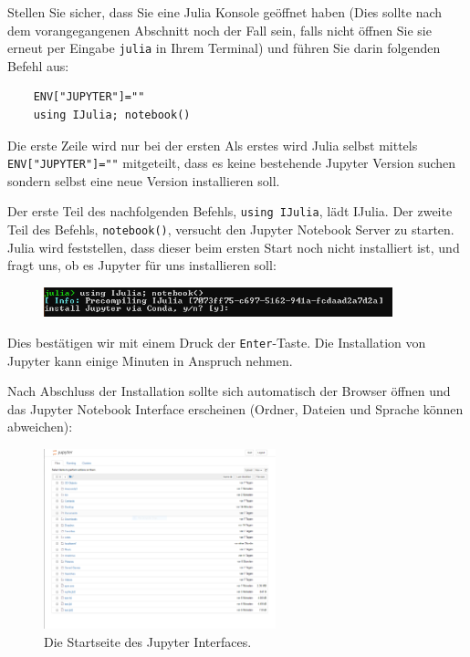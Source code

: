 \documentclass[11pt, a4paper]{scrartcl}
\begin{document}
	Stellen Sie sicher, dass Sie eine Julia Konsole geöffnet haben (Dies sollte nach dem vorangegangenen Abschnitt noch der Fall sein, falls nicht öffnen Sie sie erneut per Eingabe \texttt{julia} in Ihrem Terminal) und führen Sie darin folgenden Befehl aus:
	
	\begin{lstlisting}
	ENV["JUPYTER"]=""
	using IJulia; notebook()
	\end{lstlisting}
	
	Die erste Zeile wird nur bei der ersten Als erstes wird Julia selbst mittels \texttt{ENV["JUPYTER"]=""} mitgeteilt, dass es keine bestehende Jupyter Version suchen sondern selbst eine neue Version installieren soll.
	
	Der erste Teil des nachfolgenden Befehls, \texttt{using IJulia}, lädt IJulia. Der zweite Teil des Befehls, \texttt{notebook()}, versucht den Jupyter Notebook Server zu starten. Julia wird feststellen, dass dieser beim ersten Start noch nicht installiert ist, und fragt uns, ob es Jupyter für uns installieren soll:
	
	\begin{figure}[h!]
	\centering
	\includegraphics[width=0.9\textwidth]{imgs/Jupyter_install.png}
	\end{figure}
	
	Dies bestätigen wir mit einem Druck der \texttt{Enter}-Taste. Die Installation von Jupyter kann einige Minuten in Anspruch nehmen.
	
	Nach Abschluss der Installation sollte sich automatisch der Browser öffnen und das Jupyter Notebook Interface erscheinen (Ordner, Dateien und Sprache können abweichen):
	
	\begin{figure}[h!]
	\centering
	\includegraphics[width=0.6\textwidth]{imgs/jupyter.png}
	\caption{Die Startseite des Jupyter Interfaces. \label{fig:jupyter}}
	\end{figure}
	
\end{document}
